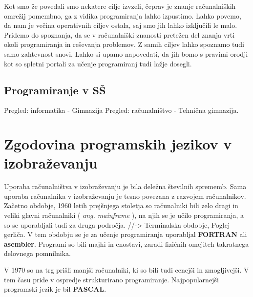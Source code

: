 Kot smo že povedali smo nekatere cilje izvzeli, čeprav je znanje
računalniških omrežij pomembno, ga z vidika programiranja lahko
izpustimo. Lahko povemo, da nam je večina operativnih ciljev ostala,
saj smo jih lahko izključili le malo. Pridemo do spoznanja, da se v
računalniški znanosti pretežen del znanja vrti okoli programiranja in
reševanja problemov. Z samih ciljev lahko spoznamo tudi samo
zahtevnost snovi. Lahko si upamo napovedati, da jih bomo s pravimi
orodji kot so spletni portali za učenje programiranj tudi lažje
dosegli.

\subsection{Programiranje v SŠ}
\label{sec:Programiranje_v_SŠ}



Pregled: informatika - Gimnazija
Pregled: računalništvo - Tehnična gimnazija.

\section{Zgodovina programskih jezikov v izobraževanju}
\label{sec:zgodovina_programskih_jezikov}




Uporaba računalništva v izobraževanju je bila deležna številnih
sprememb. Sama uporaba računalnika v izobraževanju je tesno
povezana z razvojem računalnikov.  Začetno obdobje, 1960 letih
prejšnjega stoletja so računalniki bili zelo dragi in veliki glavni
računalniki ( \emph{ang. mainframe} ), na njih se je učilo
programiranja, a so se uporabljali tudi za druga področja.
//-\textgreater{} Terminalska obdobje, Poglej gerliča. V tem obdobju
se je za učenje programiranja uporabljal \textbf{FORTRAN} ali
\textbf{asembler}. Programi so bili majhi in enostavi, zaradi fizičnih
omejiteh takratnega delovnega pomnilnika.

V 1970 so na trg prišli manjši računalniki, ki so bili tudi cenejši in
zmogljivejši. V tem času pride v ospredje strukturirano programiranje.
Najpopularnejši programski jezik je bil \textbf{PASCAL}.

